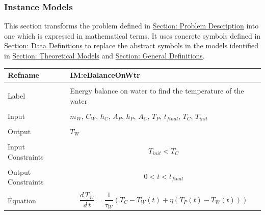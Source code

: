 \documentclass[12pt]{article}
\begin{document}
\subsubsection{Instance Models}
\label{Sec:IMs}
This section transforms the problem defined in \hyperref[Sec:ProbDesc]{Section: Problem Description} into one which is expressed in mathematical terms. It uses concrete symbols defined in \hyperref[Sec:DDs]{Section: Data Definitions} to replace the abstract symbols in the models identified in \hyperref[Sec:TMs]{Section: Theoretical Models} and \hyperref[Sec:GDs]{Section: General Definitions}.
~\newline
 \noindent \begin{minipage}{\textwidth}
\begin{tabular}{p{} p{}}
\toprule \textbf{Refname} & \textbf{IM:eBalanceOnWtr}
\label{IM:eBalanceOnWtr}
\\ \midrule \\
Label & Energy balance on water to find the temperature of the water
        \\ \midrule \\
        Input & ${m_{W}}$, ${C_{W}}$, ${h_{C}}$, ${A_{P}}$, ${h_{P}}$, ${A_{C}}$, ${T_{P}}$, ${t_{final}}$, ${T_{C}}$, ${T_{init}}$
                \\ \midrule \\
                Output & ${T_{W}}$
                         \\ \midrule \\
                         Input Constraints & \begin{dmath}
                                             {T_{init}}<{T_{C}}
                                             \end{dmath}
                                             \\ \midrule \\
                                             Output Constraints & \begin{dmath}
                                                                  0<t<{t_{final}}
                                                                  \end{dmath}
                                                                  \\ \midrule \\
                                                                  Equation & \begin{dmath}
                                                                             \frac{d\,{T_{W}}}{d\,t}=\frac{1}{{τ_{W}}} \left({T_{C}}-{T_{W}}\left(t\right)+η \left({T_{P}}\left(t\right)-{T_{W}}\left(t\right)\right)\right)

\end{dmath}
\end{tabular}
\end{minipage}
\end{document}
